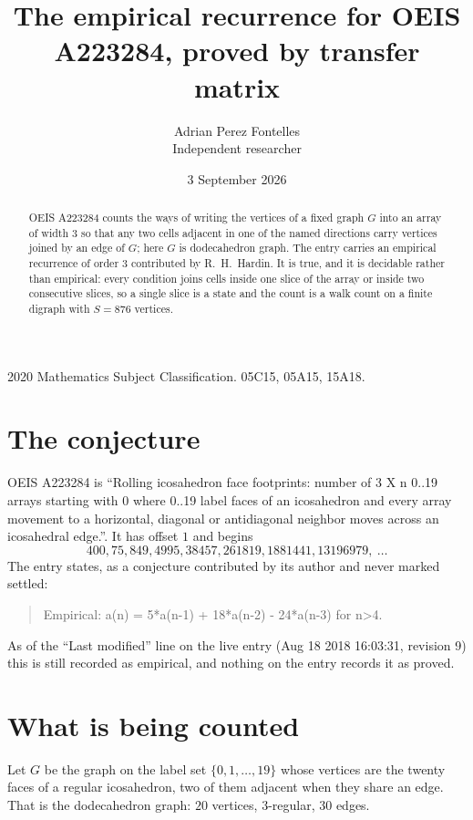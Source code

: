 \documentclass[11pt,a4paper]{article}
\title{The empirical recurrence for OEIS A223284, proved by transfer matrix}
\author{Adrian Perez Fontelles\\ \small Independent researcher}
\date{3 September 2026}
\theoremstyle{plain}
\theoremstyle{definition}
\begin{document}
\maketitle

\begin{abstract}
OEIS A223284 counts the ways of writing the vertices of a fixed graph $G$ into an array of width
$3$ so that any two cells adjacent in one of the named directions carry vertices joined by an
edge of $G$; here $G$ is dodecahedron graph. The entry carries an empirical recurrence of order $3$
contributed by R.~H.~Hardin. It is true, and it is decidable rather than empirical: every
condition joins cells inside one slice of the array or inside two consecutive slices, so a
single slice is a state and the count is a walk count on a finite digraph with $S=876$ vertices.
\end{abstract}

\noindent\small 2020 Mathematics Subject Classification. 05C15, 05A15, 15A18.\normalsize

\section{The conjecture}

OEIS A223284 is ``Rolling icosahedron face footprints: number of 3 X n 0..19 arrays starting with 0 where 0..19 label faces of an icosahedron and every array movement to a horizontal, diagonal or antidiagonal neighbor moves across an icosahedral edge.''. It has offset $1$ and begins
\[
400, 75, 849, 4995, 38457, 261819, 1881441, 13196979,\ \dots
\]
The entry states, as a conjecture contributed by its author and never marked settled:
\begin{quote}
Empirical: a(n) = 5*a(n-1) + 18*a(n-2) - 24*a(n-3) for n>4.
\end{quote}
As of the ``Last modified'' line on the live entry (Aug 18 2018 16:03:31, revision 9) this is still
recorded as empirical, and nothing on the entry records it as proved.

\section{What is being counted}

Let $G$ be the graph on the label set $\{0,1,\dots,19\}$ whose vertices are the twenty faces of a regular icosahedron, two of them adjacent when they share an edge. That is the dodecahedron graph: $20$ vertices, $3$-regular, $30$ edges.
\end{document}
